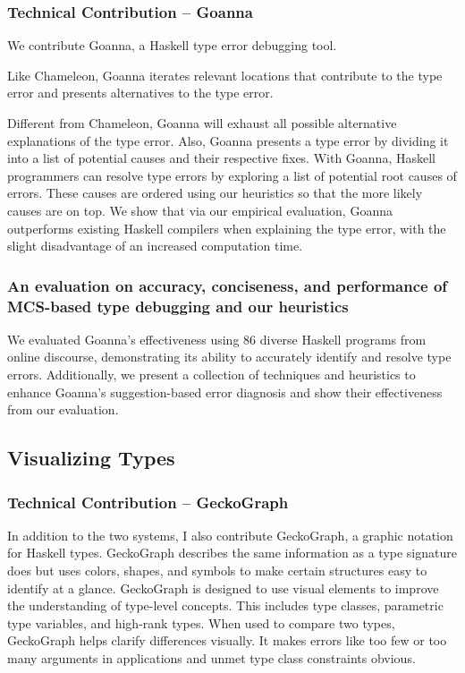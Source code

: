 \subsubsection{Technical Contribution -- Goanna}

We contribute Goanna, a Haskell type error debugging tool. 

Like Chameleon, Goanna iterates relevant locations that contribute to the type error and presents alternatives to the type error. 

Different from Chameleon, Goanna will exhaust all possible alternative explanations of the type error. Also, Goanna presents a type error by dividing it into a list of potential causes and their respective fixes. With Goanna, Haskell programmers can resolve type errors by exploring a list of potential root causes of errors. These causes are ordered using our heuristics so that the more likely causes are on top. We show that via our empirical evaluation, Goanna outperforms existing Haskell compilers when explaining the type error, with the slight disadvantage of an increased computation time.

\subsubsection{An evaluation on accuracy, conciseness, and performance of MCS-based type debugging and our heuristics}

We evaluated Goanna's effectiveness using 86 diverse Haskell programs from online discourse, demonstrating its ability to accurately identify and resolve type errors. Additionally, we present a collection of techniques and heuristics to enhance Goanna's suggestion-based error diagnosis and show their effectiveness from our evaluation.


\subsection{Visualizing Types}

\subsubsection{Technical Contribution -- GeckoGraph}

In addition to the two systems, I also contribute GeckoGraph, a graphic notation for Haskell types. GeckoGraph describes the same information as a type signature does but uses colors, shapes, and symbols to make certain structures easy to identify at a glance. GeckoGraph is designed to use visual elements to improve the understanding of type-level concepts. This includes type classes, parametric type variables, and high-rank types. When used to compare two types, GeckoGraph helps clarify differences visually. It makes errors like too few or too many arguments in applications and unmet type class constraints obvious.

